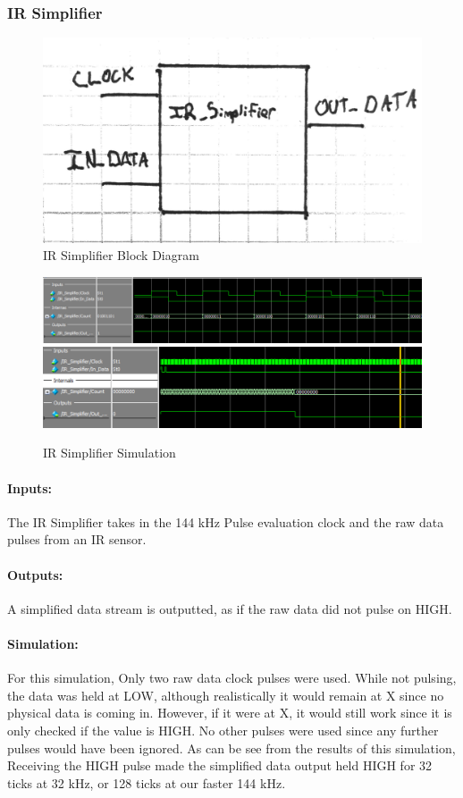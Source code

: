 \documentclass[]{article}
\begin{document}
\subsubsection{IR Simplifier}
\label{irsimplifier}
\begin{figure}[H]\centering
    \includegraphics[width=0.6\linewidth]{figures/IR_Simplifier_Block.jpg}
    \caption{IR Simplifier Block Diagram}
    \label{fig:irSimplifierBlock}
\end{figure}
\begin{figure}[H]\centering
    \includegraphics[width=\linewidth]{figures/IR_Simplifier_Sim1.png}
    \includegraphics[width=\linewidth]{figures/IR_Simplifier_Sim2.png}
    \caption{IR Simplifier Simulation}
    \label{fig:irSimplifierSim}
\end{figure}
\paragraph{Inputs:} The IR Simplifier takes in the 144 kHz Pulse evaluation clock and the raw data pulses from an IR sensor. 
\paragraph{Outputs:} A simplified data stream is outputted, as if the raw data did not pulse on HIGH.
\paragraph{Simulation:} For this simulation, Only two raw data clock pulses were used.
While not pulsing, the data was held at LOW, although realistically it would remain at X since no physical data is coming in.
However, if it were at X, it would still work since it is only checked if the value is HIGH. No other pulses were used since any further pulses would have been ignored.
As can be see from the results of this simulation, Receiving the HIGH pulse made the simplified data output held HIGH for 32 ticks at 32 kHz, or 128 ticks at our faster 144 kHz.
\end{document}
